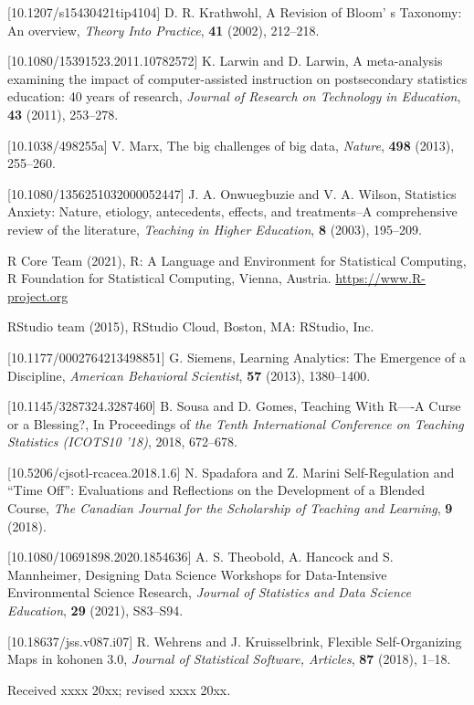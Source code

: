 \documentclass{aims}
\theoremstyle{definition}
\begin{document}
\begin{thebibliography}{99}
 [10.1207/s15430421tip4104]
     \newblock  D. R. Krathwohl,
     \newblock A Revision of Bloom' s Taxonomy: An overview,
     \newblock \emph{Theory Into Practice}, \textbf{41} (2002), 212--218.

 [10.1080/15391523.2011.10782572]
     \newblock  K. Larwin and D. Larwin,
     \newblock A meta-analysis examining the impact of computer-assisted instruction on postsecondary statistics education: 40 years of research,
     \newblock \emph{Journal of Research on Technology in Education}, \textbf{43} (2011), 253--278.

 [10.1038/498255a]
     \newblock  V. Marx,
     \newblock The big challenges of big data,
     \newblock \emph{Nature}, \textbf{498} (2013), 255--260.

 [10.1080/1356251032000052447]
     \newblock J. A. Onwuegbuzie  and V. A. Wilson,
     \newblock Statistics Anxiety: Nature, etiology, antecedents, effects, and treatments--A comprehensive review of the literature,
     \newblock \emph{Teaching in Higher Education}, \textbf{8} (2003), 195--209.

     \newblock R Core Team (2021),
     \newblock R: A Language and Environment for Statistical Computing,
     \newblock R Foundation for
  Statistical Computing, Vienna, Austria. \url{
  https://www.R-project.org}

     \newblock RStudio team (2015),
     \newblock RStudio Cloud,
     \newblock Boston, MA: RStudio, Inc.

 [10.1177/0002764213498851]
     \newblock G. Siemens,
     \newblock Learning Analytics: The Emergence of a Discipline,
     \newblock \emph{American Behavioral Scientist}, \textbf{57} (2013), 1380--1400.

 [10.1145/3287324.3287460]
     \newblock B. Sousa and D. Gomes,
     \newblock Teaching With R—-A Curse or a Blessing?,
     \newblock In Proceedings of \emph{the Tenth International Conference on Teaching Statistics (ICOTS10 '18)}, 2018, 672–678.

 [10.5206/cjsotl-rcacea.2018.1.6]
     \newblock N. Spadafora and Z. Marini
     \newblock Self-Regulation and “Time Off”: Evaluations and Reflections on the Development of a Blended Course,
     \newblock \emph{The Canadian Journal for the Scholarship of Teaching and Learning}, \textbf{9} (2018).

 [10.1080/10691898.2020.1854636]
     \newblock A. S. Theobold, A. Hancock and S. Mannheimer,
     \newblock  Designing Data Science Workshops for Data-Intensive Environmental Science Research,
     \newblock \emph{Journal of Statistics and Data Science Education}, \textbf{29} (2021), S83--S94.

 [10.18637/jss.v087.i07]
     \newblock R. Wehrens and J. Kruisselbrink,
     \newblock  Flexible Self-Organizing Maps in kohonen 3.0,
     \newblock \emph{Journal of Statistical Software, Articles}, \textbf{87} (2018), 1--18.

\end{thebibliography}

\medskip
Received xxxx 20xx; revised xxxx 20xx.
\medskip
\end{document}
